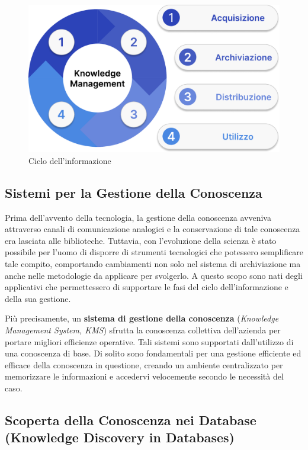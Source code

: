 \begin{figure}[H]
    \centering
    \includegraphics[width=0.8\linewidth]{figure//capitolo_3/Knowledge Management Process.pdf}
    \caption{Ciclo dell'informazione}
    \label{fig:Knowledge Management Process}
\end{figure}

\subsection{Sistemi per la Gestione della Conoscenza}

Prima dell'avvento della tecnologia, la gestione della conoscenza avveniva attraverso canali di comunicazione analogici e la conservazione di tale conoscenza era lasciata alle biblioteche. Tuttavia, con l'evoluzione della scienza è stato possibile per l'uomo di disporre di strumenti tecnologici che potessero semplificare tale compito, comportando cambiamenti non solo nel sistema di archiviazione ma anche nelle metodologie da applicare per svolgerlo. A questo scopo sono nati degli applicativi che permettessero di supportare le fasi del ciclo dell'informazione e della sua gestione.

Più precisamente, un \textbf{sistema di gestione della conoscenza} (\textit{Knowledge Management System, KMS}) sfrutta la conoscenza collettiva dell'azienda per portare migliori efficienze operative. Tali sistemi sono supportati dall'utilizzo di una conoscenza di base. Di solito sono fondamentali per una gestione efficiente ed efficace della conoscenza in questione, creando un ambiente centralizzato per memorizzare le informazioni e accedervi velocemente secondo le necessità del caso.

\subsection{Scoperta della Conoscenza nei Database (Knowledge Discovery in Databases)}

